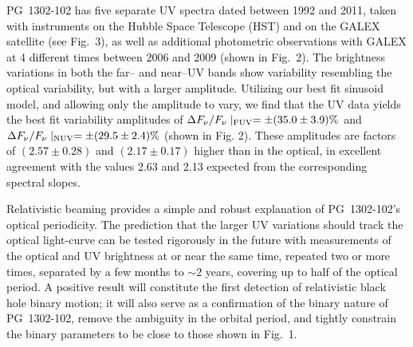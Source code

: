 PG~1302-102 has five separate UV spectra dated between 1992 and 2011,
taken with instruments on the Hubble Space Telescope (HST) and on the
GALEX satellite (see Fig.~3), as well as additional photometric
observations with GALEX at 4 different times between 2006 and 2009
(shown in Fig.~2).  The brightness variations in both the far-- and
near--UV bands show variability resembling the optical variability,
but with a larger amplitude.  
Utilizing our best fit sinusoid model, and allowing
only the amplitude to vary, we find that the UV data yields the
best fit variability amplitudes of $\Delta F_\nu/F_\nu\mid_{\rm FUV} =
\pm(35.0 \pm3.9)\%$ and $\Delta F_\nu/F_\nu\mid_{\rm NUV} = \pm(29.5
\pm2.4)\%$ (shown in Fig. 2). These amplitudes are factors of
$(2.57\pm0.28)$ and $(2.17\pm0.17)$ higher than in the optical, in
excellent agreement with the values 2.63 and 2.13 expected from the
corresponding spectral slopes.

Relativistic beaming provides a simple and robust explanation of
PG~1302-102's optical periodicity.  The prediction that the larger UV
variations should track the optical light-curve can be tested
rigorously in the future with measurements of the optical and UV
brightness at or near the same time, repeated two or more times,
separated by a few months to $\sim 2$ years, covering up to half of
the optical period. A positive result will constitute the first
detection of relativistic black hole binary motion; it will also serve
as a confirmation of the binary nature of PG~1302-102, remove the
ambiguity in the orbital period, and tightly constrain the binary
parameters to be close to those shown in Fig.~1.









